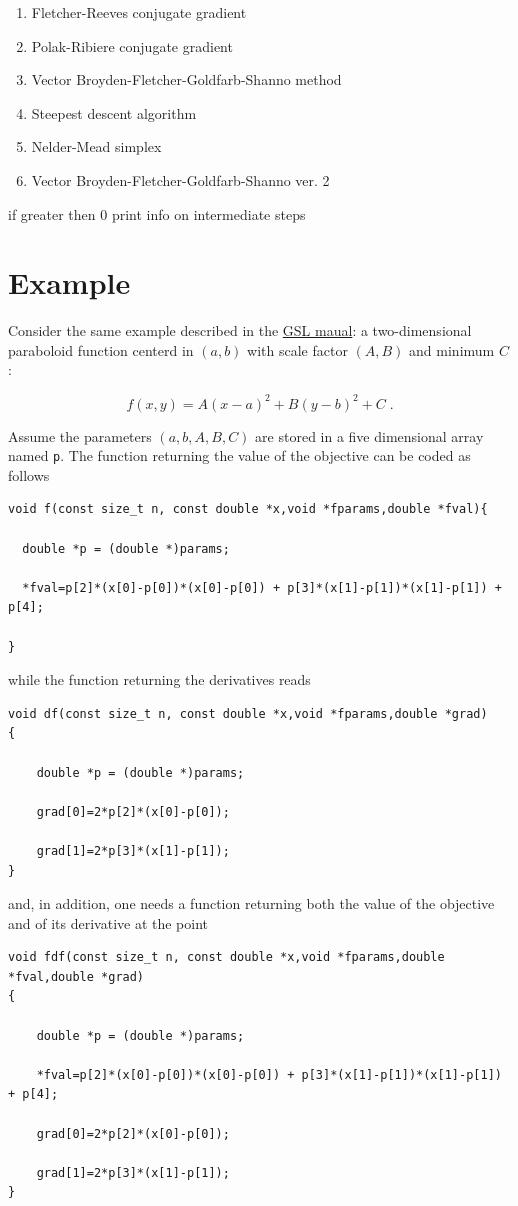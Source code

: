\documentclass[11pt]{article}
\begin{document}
\begin{description}
\begin{description}
\begin{enumerate}
\item Fletcher-Reeves conjugate gradient
\item Polak-Ribiere conjugate gradient
\item Vector Broyden-Fletcher-Goldfarb-Shanno method
\item Steepest descent algorithm
\item Nelder-Mead simplex
\item Vector Broyden-Fletcher-Goldfarb-Shanno ver. 2
\end{enumerate}
\item[\texttt{unsigned verbosity}] if greater then 0 print info
                    on intermediate steps
\end{description}
\end{description}
\section{Example}
\label{sec-4}


Consider the same example described in the \href{http://www.gnu.org/software/gsl/manual/html_node/Providing-a-function-to-minimize.html}{GSL maual}: a
two-dimensional paraboloid function centerd in $(a,b)$ with scale
factor $(A,B)$ and minimum $C$:

\[
f(x,y) = A (x-a)^2 + B (y-b)^2 + C \;.
\]

Assume the parameters $(a,b,A,B,C)$ are stored in a five dimensional
array named \texttt{p}. The function returning the value of the objective can
be coded as follows
\begin{verbatim}
void f(const size_t n, const double *x,void *fparams,double *fval){

  double *p = (double *)params;

  *fval=p[2]*(x[0]-p[0])*(x[0]-p[0]) + p[3]*(x[1]-p[1])*(x[1]-p[1]) + p[4];

}
\end{verbatim}
while the function returning the derivatives reads
\begin{verbatim}
void df(const size_t n, const double *x,void *fparams,double *grad)
{
  
    double *p = (double *)params;
  
    grad[0]=2*p[2]*(x[0]-p[0]);

    grad[1]=2*p[3]*(x[1]-p[1]);
}
\end{verbatim}
and, in addition, one needs a function returning both the value of the
objective and of its derivative at the point
\begin{verbatim}
void fdf(const size_t n, const double *x,void *fparams,double *fval,double *grad)
{
  
    double *p = (double *)params;

    *fval=p[2]*(x[0]-p[0])*(x[0]-p[0]) + p[3]*(x[1]-p[1])*(x[1]-p[1]) + p[4];
  
    grad[0]=2*p[2]*(x[0]-p[0]);

    grad[1]=2*p[3]*(x[1]-p[1]);
}
\end{verbatim}
\end{document}

